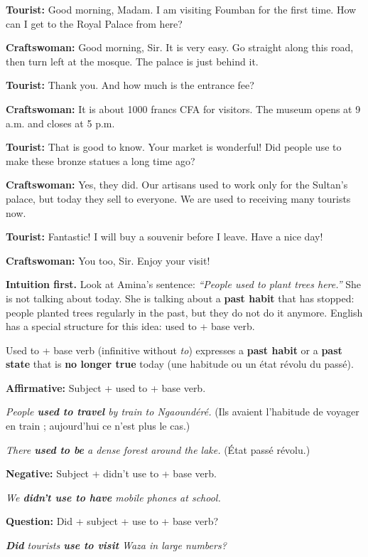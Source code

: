 \documentclass[11pt]{article}
\newcommand{\cle}[1]{{\popxbold\color{popdark}#1}}
\newcounter{popsec}
\newcounter{popsub}
\newcommand{\courssub}[1]{%
  \stepcounter{popsub}%
  \par\vspace{9pt}\noindent{\popxbold\fontsize{11.5}{13}\selectfont\color{popink}{\color{poporange}\thepopsec.\thepopsub}\hspace{6pt}#1}\par\nopagebreak\vspace{4pt}
}
\begin{document}
\begin{exemplebox}
\textbf{Tourist:} Good morning, Madam. I am visiting Foumban for the first time. How can I get to the Royal Palace from here?\par
\textbf{Craftswoman:} Good morning, Sir. It is very easy. Go straight along this road, then turn left at the mosque. The palace is just behind it.\par
\textbf{Tourist:} Thank you. And how much is the entrance fee?\par
\textbf{Craftswoman:} It is about \num{1000} francs CFA for visitors. The museum opens at 9 a.m. and closes at 5 p.m.\par
\textbf{Tourist:} That is good to know. Your market is wonderful! Did people use to make these bronze statues a long time ago?\par
\textbf{Craftswoman:} Yes, they did. Our artisans used to work only for the Sultan's palace, but today they sell to everyone. We are used to receiving many tourists now.\par
\textbf{Tourist:} Fantastic! I will buy a souvenir before I leave. Have a nice day!\par
\textbf{Craftswoman:} You too, Sir. Enjoy your visit!
\end{exemplebox}

\courssub{Grammar focus: used to + base verb}

\textbf{Intuition first.} Look at Amina's sentence: \emph{``People used to plant trees here.''} She is not talking about today. She is talking about a \textbf{past habit} that has stopped: people planted trees regularly in the past, but they do not do it anymore. English has a special structure for this idea: \cle{used to} + base verb.

\begin{definition}
\cle{Used to} + base verb (infinitive without \emph{to}) expresses a \textbf{past habit} or a \textbf{past state} that is \textbf{no longer true} today (une habitude ou un état révolu du passé).\par
\textbf{Affirmative:} Subject + used to + base verb.\par
\emph{People \textbf{used to travel} by train to Ngaoundéré.} (Ils avaient l'habitude de voyager en train ; aujourd'hui ce n'est plus le cas.)\par
\emph{There \textbf{used to be} a dense forest around the lake.} (État passé révolu.)\par
\textbf{Negative:} Subject + didn't use to + base verb.\par
\emph{We \textbf{didn't use to have} mobile phones at school.}\par
\textbf{Question:} Did + subject + use to + base verb?\par
\emph{\textbf{Did} tourists \textbf{use to visit} Waza in large numbers?}
\end{definition}
\end{document}
